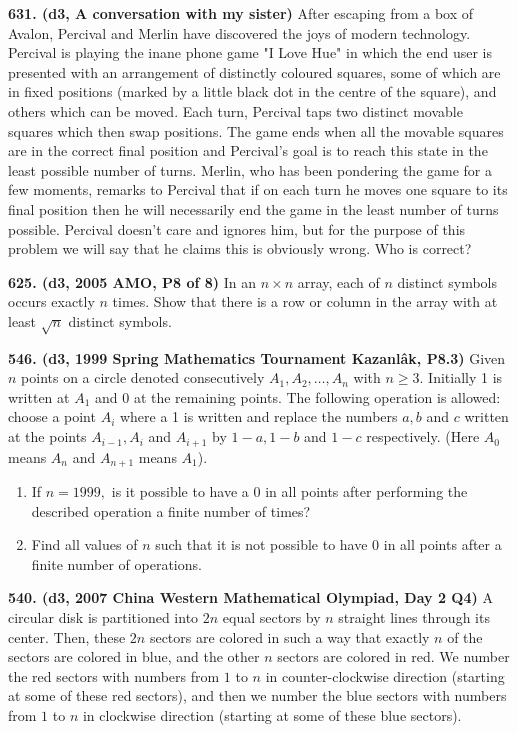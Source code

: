 \documentclass{article}
\begin{document}
        \textbf{631. (\color{red}d3\color{black}, A conversation with my sister)} After escaping from a box of Avalon, Percival and Merlin have discovered the joys of modern technology. Percival is playing the inane phone game "I Love Hue" in which the end user is presented with an arrangement of distinctly coloured squares, some of which are in fixed positions (marked by a little black dot in the centre of the square), and others which can be moved. Each turn, Percival taps two distinct movable squares which then swap positions. The game ends when all the movable squares are in the correct final position and Percival's goal is to reach this state in the least possible number of turns. Merlin, who has been pondering the game for a few moments, remarks to Percival that if on each turn he moves one square to its final position then he will necessarily end the game in the least number of turns possible. Percival doesn't care and ignores him, but for the purpose of this problem we will say that he claims this is obviously wrong. Who is correct?

        \textbf{625. (\color{red}d3\color{black}, 2005 AMO, P8 of 8)} In an $n \times n$ array, each of $n$ distinct symbols occurs exactly $n$ times. Show that there is a row or column in the array with at least $\sqrt{n}$ distinct symbols.

        \textbf{546. (\color{red}d3\color{black}, 1999 Spring Mathematics Tournament Kazanlâk, P8.3)} Given $n$ points on a circle denoted consecutively $A_{1}, A_{2}, \ldots, A_{n}$ with $n \geq 3$.
        Initially 1 is written at $A_{1}$ and 0 at the remaining points. The following operation is allowed:
        choose a point $A_{i}$ where a 1 is written and replace the numbers $a, b$ and $c$ written at the points $A_{i-1}, A_{i}$ and $A_{i+1}$ by $1-a, 1-b$ and $1-c$ respectively. (Here $A_{0}$ means $A_{n}$
        and $A_{n+1}$ means $A_{1}$).
        \begin{enumerate}
                \item If $n=1999,$ is it possible to have a 0 in all points after performing the described operation a finite number of times?
                \item Find all values of $n$ such that it is not possible to have 0 in all points after a finite
                      number of operations.
        \end{enumerate}

        \textbf{540. (\color{red}d3\color{black}, 2007 China Western Mathematical Olympiad, Day 2 Q4)} A circular disk is partitioned into $ 2n$ equal sectors by $ n$ straight lines through its center. Then, these $ 2n$ sectors are colored in such a way that exactly $ n$ of the sectors are colored in blue, and the other $ n$ sectors are colored in red. We number the red sectors with numbers from $ 1$ to $ n$ in counter-clockwise direction (starting at some of these red sectors), and then we number the blue sectors with numbers from $ 1$ to $ n$ in clockwise direction (starting at some of these blue sectors).
\end{document}
